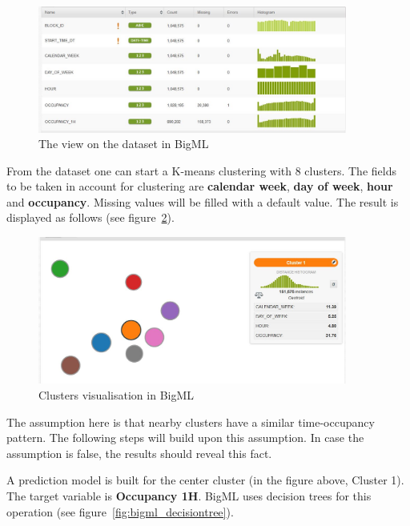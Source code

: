 \documentclass{article}
\begin{document}
\begin{figure}[!ht]
    \centering
    \includegraphics[width=4.0in]{bigml_dataset.jpg}
    \caption{The view on the dataset in BigML}
    \label{fig:bigml_dataset}
\end{figure}

From the dataset one can start a K-means clustering with 8 clusters. The fields to be taken in account for clustering are \textbf{calendar week}, \textbf{day of week}, \textbf{hour} and \textbf{occupancy}. Missing values will be filled with a default value. The result is displayed as follows (see figure~\ref{fig:bigml_clusters}).
\vspace{2mm}

\begin{figure}[!ht]
    \centering
    \includegraphics[width=4.0in]{bigml_clusters.jpg}
    \caption{Clusters visualisation in BigML}
    \label{fig:bigml_clusters}
\end{figure}

The assumption here is that nearby clusters have a similar time-occupancy pattern. The following steps will build upon this assumption. In case the assumption is false, the results should reveal this fact.
\vspace{2mm}

A prediction model is built for the center cluster (in the figure above, Cluster 1). The target variable is \textbf{Occupancy 1H}. BigML uses decision trees for this operation (see figure~\ref{fig:bigml_decisiontree}).
\vspace{2mm}
\end{document}
